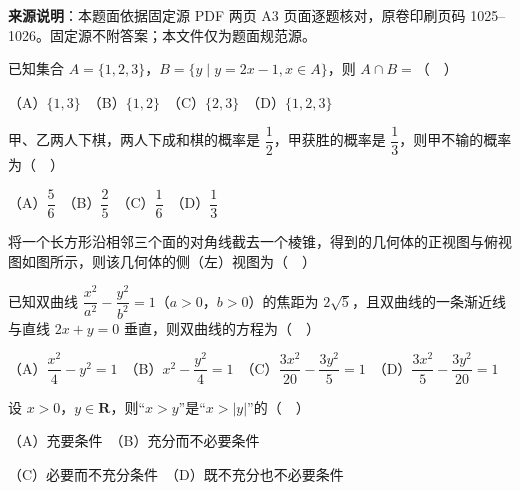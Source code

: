 


\begin{gktip}
\textbf{来源说明}：本题面依据固定源 PDF 两页 A3 页面逐题核对，原卷印刷页码 1025–1026。固定源不附答案；本文件仅为题面规范源。
\end{gktip}


\begin{question}
已知集合 \(A=\{1,2,3\}\)，\(B=\{y\mid y=2x-1,x\in A\}\)，则 \(A\cap B=\)（　）

（A）\(\{1,3\}\)　（B）\(\{1,2\}\)　（C）\(\{2,3\}\)　（D）\(\{1,2,3\}\)

\end{question}
\begin{question}
甲、乙两人下棋，两人下成和棋的概率是 \(\dfrac{1}{2}\)，甲获胜的概率是 \(\dfrac{1}{3}\)，则甲不输的概率为（　）

（A）\(\dfrac{5}{6}\)　（B）\(\dfrac{2}{5}\)　（C）\(\dfrac{1}{6}\)　（D）\(\dfrac{1}{3}\)

\Needspace{0.4\textheight}
\end{question}
\begin{question}
将一个长方形沿相邻三个面的对角线截去一个棱锥，得到的几何体的正视图与俯视图如图所示，则该几何体的侧（左）视图为（　）
\nopagebreak[4]
\begin{center}\end{center}
\nopagebreak[4]
\end{question}
\begin{question}
已知双曲线 \(\dfrac{x^{2}}{a^{2}}-\dfrac{y^{2}}{b^{2}}=1\)（\(a>0\)，\(b>0\)）的焦距为 \(2\sqrt{5}\)，且双曲线的一条渐近线与直线 \(2x+y=0\) 垂直，则双曲线的方程为（　）

（A）\(\dfrac{x^{2}}{4}-y^{2}=1\)　（B）\(x^{2}-\dfrac{y^{2}}{4}=1\)　（C）\(\dfrac{3x^{2}}{20}-\dfrac{3y^{2}}{5}=1\)　（D）\(\dfrac{3x^{2}}{5}-\dfrac{3y^{2}}{20}=1\)

\end{question}
\begin{question}
设 \(x>0\)，\(y\in\mathbf{R}\)，则“\(x>y\)”是“\(x>|y|\)”的（　）

（A）充要条件　（B）充分而不必要条件

（C）必要而不充分条件　（D）既不充分也不必要条件

\end{question}
